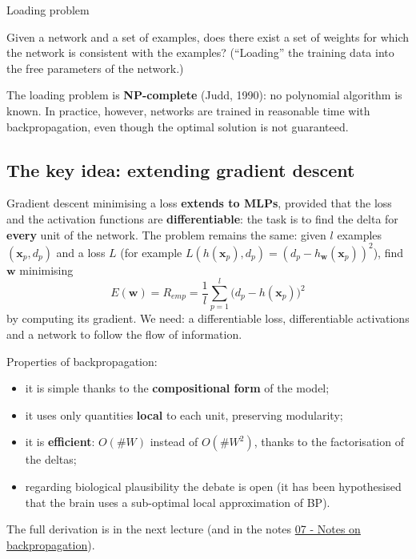 \begin{boxdefinition}{Loading problem}

Given a network and a set of examples, does there exist a set of
weights for which the network is consistent with the examples?
(``Loading'' the training data into the free parameters of the
network.)

\end{boxdefinition}

The loading problem is \textbf{NP-complete} (Judd, 1990): no polynomial
algorithm is known. In practice, however, networks are trained in
reasonable time with backpropagation, even though the optimal solution
is not guaranteed.

\subsection{The key idea: extending gradient
descent}\label{lidea-chiave-estendere-la-discesa-del-gradiente}

Gradient descent minimising a loss \textbf{extends to MLPs}, provided
that the loss and the activation functions are
\textbf{differentiable}: the task is to find the delta for
\textbf{every} unit of the network. The problem remains the same: given
\(l\) examples \((\mathbf{x}_p, d_p)\) and a loss \(L\) (for example
\(L(h(\mathbf{x}_p), d_p) = (d_p - h_\mathbf{w}(\mathbf{x}_p))^2\)),
find \(\mathbf{w}\) minimising \[
E(\mathbf{w}) = R_{emp} = \frac{1}{l}\sum_{p=1}^{l}\big(d_p - h(\mathbf{x}_p)\big)^2
\] by computing its gradient. We need: a differentiable loss,
differentiable activations and a network to follow the flow of
information.

Properties of backpropagation:

\begin{itemize}
\tightlist
\item
  it is simple thanks to the \textbf{compositional form} of the model;
\item
  it uses only quantities \textbf{local} to each unit, preserving
  modularity;
\item
  it is \textbf{efficient}: \(O(\#W)\) instead of \(O(\#W^2)\), thanks
  to the factorisation of the deltas;
\item
  regarding biological plausibility the debate is open (it has been
  hypothesised that the brain uses a sub-optimal local approximation of
  BP).
\end{itemize}

The full derivation is in the next lecture (and in the notes
\href{07\%20-\%20Note\%20sulla\%20backpropagation}{07 - Notes on
backpropagation}).

